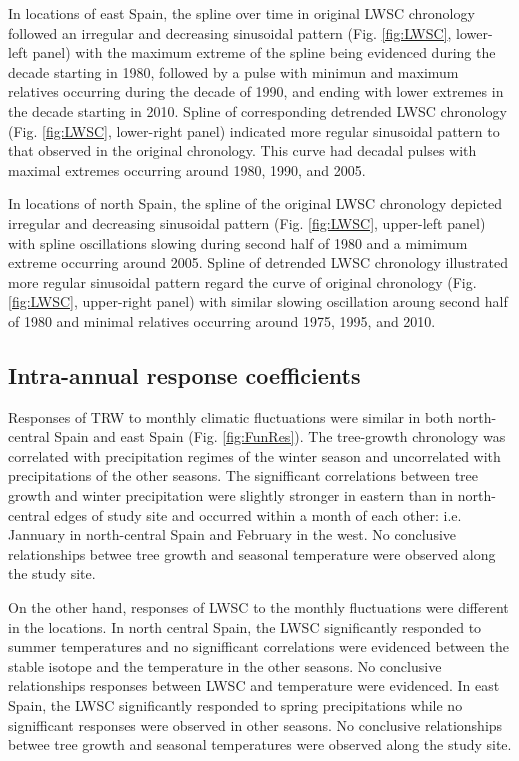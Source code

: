 \documentclass[review,authoryear]{elsarticle}
\begin{document}
In locations of east Spain, the spline over time in original
\gls{LWSC} chronology followed an irregular and decreasing sinusoidal
pattern (Fig. \ref{fig:LWSC}, lower-left panel) with the maximum
extreme of the spline being evidenced during the decade starting in
1980, followed by a pulse with minimun and maximum relatives occurring
during the decade of 1990, and ending with lower extremes in the
decade starting in 2010.  Spline of corresponding detrended \gls{LWSC}
chronology (Fig. \ref{fig:LWSC}, lower-right panel) indicated more
regular sinusoidal pattern to that observed in the original
chronology. This curve had decadal pulses with maximal extremes
occurring around 1980, 1990, and 2005.

In locations of north Spain, the spline of the original \gls{LWSC}
chronology depicted irregular and decreasing sinusoidal pattern
(Fig. \ref{fig:LWSC}, upper-left panel) with spline oscillations
slowing during second half of 1980 and a mimimum extreme occurring
around 2005. Spline of detrended \gls{LWSC} chronology illustrated
more regular sinusoidal pattern regard the curve of original
chronology (Fig. \ref{fig:LWSC}, upper-right panel) with similar
slowing oscillation aroung second half of 1980 and minimal relatives
occurring around 1975, 1995, and 2010.

\subsection{Intra-annual response coefficients}
Responses of \gls{TRW} to monthly climatic fluctuations were
similar in both north-central Spain and east Spain
(Fig. \ref{fig:FunRes}). The tree-growth chronology was correlated
with precipitation regimes of the winter season and uncorrelated with
precipitations of the other seasons. The signifficant correlations
between tree growth and winter precipitation were slightly stronger in
eastern than in north-central edges of study site and occurred within
a month of each other: i.e. Jannuary in north-central Spain and
February in the west. No conclusive relationships betwee tree growth
and seasonal temperature were observed along the study site.

On the other hand, responses of \gls{LWSC} to the monthly fluctuations
were different in the locations. In north central Spain, the
\gls{LWSC} significantly responded to summer temperatures and no
signifficant correlations were evidenced between the stable isotope
and the temperature in the other seasons. No conclusive relationships
responses between \gls{LWSC} and temperature were evidenced. In east
Spain, the \gls{LWSC} significantly responded to spring precipitations
while no signifficant responses were observed in other seasons. No
conclusive relationships betwee tree growth and seasonal temperatures
were observed along the study site.
\end{document}
